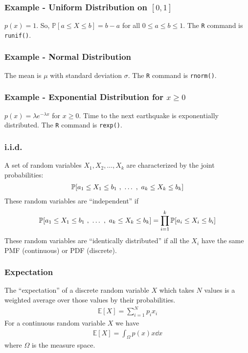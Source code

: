 \documentclass{article}
\newcommand{\prob}{\mathbb{P}}
\newcommand{\expectation}{\mathbb{E}}
\begin{document}
            \subsubsection{Example - Uniform Distribution on $[0,1]$}
                $p(x) = 1$.  So, $\prob[a\leq X \leq b] = b - a$ for all $0 \leq a \leq b \leq 1$.  The \texttt{R} command is \texttt{runif()}.
            \subsubsection{Example - Normal Distribution}
                The mean is $\mu$ with standard deviation $\sigma$.  The \texttt{R} command is \texttt{rnorm()}.
            \subsubsection{Example - Exponential Distribution for $x \geq 0$}
                $p(x) = \lambda e^{-\lambda x}$ for $x \geq 0$.  Time to the next earthquake is exponentially distributed.  The \texttt{R} command is \texttt{rexp()}.
            \subsubsection{i.i.d.}
                A set of random variables $X_1,X_2,\dots,X_k$ are characterized by the joint probabilities:
                \begin{align*}
                    \prob\qty[a_1 \leq X_1 \leq b_1\ ,\ \dots\ ,\ a_k \leq X_k \leq b_k]
                \end{align*}
                These random variables are ``independent'' if
                \begin{align*}
                    \prob\qty[a_1 \leq X_1 \leq b_1\ ,\ \dots\ ,\ a_k \leq X_k \leq b_k] = \prod_{i=1}^k\prob\qty[a_i \leq X_i \leq b_i]
                \end{align*}
                These random variables are ``identically distributed'' if all the $X_i$ have the same PMF (continuous) or PDF (discrete).
            \subsubsection{Expectation}
                The ``expectation'' of a discrete random variable $X$ which takes $N$ values is a weighted average over those values by their probabilities.
                \begin{align}
                    \expectation[X] = \sum_{i=1}^N p_i x_i
                \end{align}
                For a continuous random variable $X$ we have
                \begin{align}
                    \expectation[X] = \int_\Omega p(x)x \dd x
                \end{align}
                where $\Omega$ is the measure space.
\end{document}
